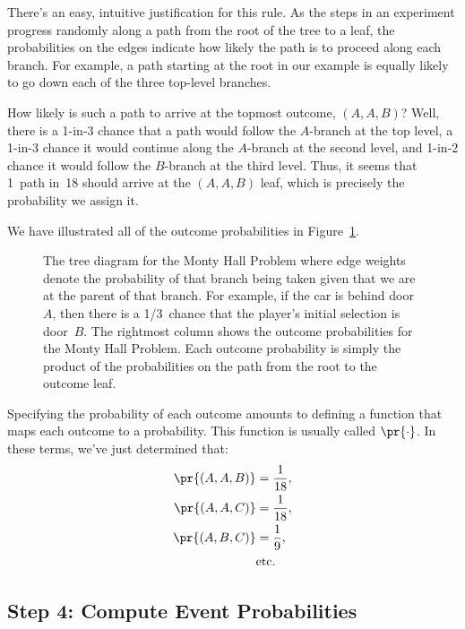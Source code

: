 There's an easy, intuitive justification for this rule.  As the steps in
an experiment progress randomly along a path from the root of the tree to
a leaf, the probabilities on the edges indicate how likely the path is to
proceed along each branch.  For example, a path starting at the root in
our example is equally likely to go down each of the three top-level
branches.

How likely is such a path to arrive at the topmost outcome, $(A, A,
B)$?  Well, there is a 1-in-3 chance that a path would follow the
$A$-branch at the top level, a 1-in-3 chance it would continue along
the $A$-branch at the second level, and 1-in-2 chance it would follow
the $B$-branch at the third level.  Thus, it seems that 1~path in~18
should arrive at the $(A, A, B)$ leaf, which is precisely the
probability we assign it.

We have illustrated all of the outcome probabilities in
Figure~\ref{fig:14A6}.

\begin{figure}


\caption{The tree diagram for the Monty Hall Problem where edge
  weights denote the probability of that branch being taken given that
  we are at the parent of that branch.  For example, if the car is
  behind door~$A$, then there is a 1/3~chance that the player's
  initial selection is door~$B$.
  The rightmost column shows the outcome probabilities for the
  Monty Hall Problem.  Each outcome probability is simply the product
  of the probabilities on the path from the root to
  the outcome leaf.}

\label{fig:14A6}
\end{figure}

Specifying the probability of each outcome amounts to defining a
function that maps each outcome to a probability.  This function is
usually called $\pr{\cdot}$.  In these terms, we've just determined
that:
\begin{align*}
\pr{(A, A, B)} & = \frac{1}{18}, \\
\pr{(A, A, C)} & = \frac{1}{18}, \\
\pr{(A, B, C)} & = \frac{1}{9}, \\
               & \text{etc.}
\end{align*}

\subsection{Step 4: Compute Event Probabilities}

